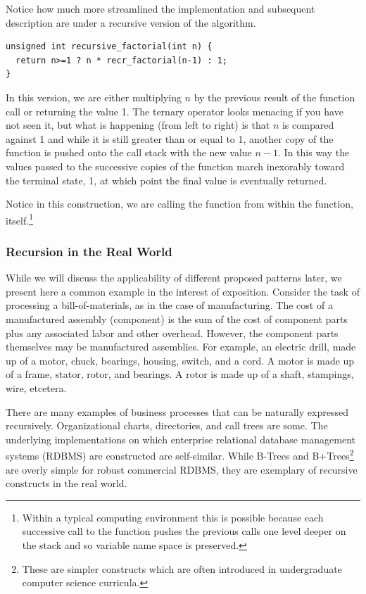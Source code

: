 \documentclass[jou,apacite]{apa6}
\begin{document}
Notice how much more streamlined the implementation and subsequent description are under a recursive version of the algorithm.
\begin{verbatim}
unsigned int recursive_factorial(int n) {
  return n>=1 ? n * recr_factorial(n-1) : 1;
}
\end{verbatim}
In this version, we are either multiplying $n$ by the previous result of the function call or returning the value 1.  The ternary operator looks menacing if you have not seen it, but what is happening (from left to right) is that $n$ is compared against 1 and while it is still greater than or equal to 1, another copy of the function is pushed onto the call stack with the new value $n-1$.  In this way the values passed to the successive copies of the function march inexorably toward
the terminal state, 1, at which point the final value is eventually returned.

Notice in this construction, we are calling the function from within the function, itself.\footnote{Within a typical computing environment this is possible because each successive call to the function pushes the previous calls one level deeper on the stack and so variable name space is preserved.}

\subsubsection{Recursion in the Real World}  %
While we will discuss the applicability of different proposed patterns later, we present here a common example in the interest of exposition.  Consider the task of processing a bill-of-materials, as in the case of manufacturing. The cost of a manufactured assembly (component) is the sum of the cost of component parts plus any associated labor and other overhead. However, the component parts themselves may be manufactured assemblies.  For example, an electric drill, made up
of a motor, chuck, bearings, housing, switch, and a cord. A motor is made up of a frame, stator, rotor, and bearings.  A rotor is made up of a shaft, stampings, wire, etcetera.

There are many examples of business processes that can be naturally expressed recursively.  Organizational charts, directories, and call trees are some.  The underlying implementations on which enterprise relational database management systems (RDBMS) are constructed are self-similar.  While B-Trees and B+Trees\footnote{These are simpler constructs which are often introduced in undergraduate computer science curricula.} are overly simple for robust commercial RDBMS, they are
exemplary of recursive constructs in the real world.
\end{document}
